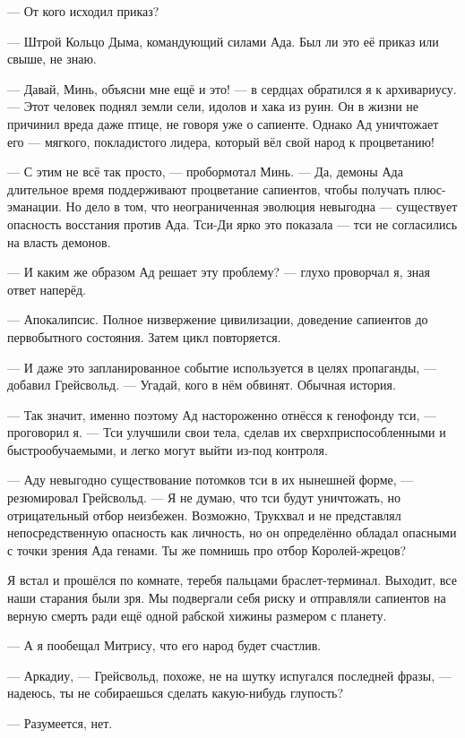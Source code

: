--- От кого исходил приказ?

--- Штрой Кольцо Дыма, командующий силами Ада.
Был ли это её приказ или свыше, не знаю.

--- Давай, Минь, объясни мне ещё и это! --- в сердцах обратился я к архивариусу.
--- Этот человек поднял земли сели, идолов и хака из руин.
Он в жизни не причинил вреда даже птице, не говоря уже о сапиенте.
Однако Ад уничтожает его --- мягкого, покладистого лидера, который вёл свой народ к процветанию!

--- С этим не всё так просто, --- пробормотал Минь.
--- Да, демоны Ада длительное время поддерживают процветание сапиентов, чтобы получать плюс-эманации.
Но дело в том, что неограниченная эволюция невыгодна --- существует опасность восстания против Ада.
Тси-Ди ярко это показала --- тси не согласились на власть демонов.

--- И каким же образом Ад решает эту проблему? --- глухо проворчал я, зная ответ наперёд.

--- Апокалипсис.
Полное низвержение цивилизации, доведение сапиентов до первобытного состояния.
Затем цикл повторяется.

--- И даже это запланированное событие используется в целях пропаганды, --- добавил Грейсвольд.
--- Угадай, кого в нём обвинят.
Обычная история.

--- Так значит, именно поэтому Ад настороженно отнёсся к генофонду тси, --- проговорил я.
--- Тси улучшили свои тела, сделав их сверхприспособленными и быстрообучаемыми, и легко могут выйти из-под контроля.

--- Аду невыгодно существование потомков тси в их нынешней форме, --- резюмировал Грейсвольд.
--- Я не думаю, что тси будут уничтожать, но отрицательный отбор неизбежен.
Возможно, Трукхвал и не представлял непосредственную опасность как личность, но он определённо обладал опасными с точки зрения Ада генами.
Ты же помнишь про отбор Королей-жрецов?

Я встал и прошёлся по комнате, теребя пальцами браслет-терминал.
Выходит, все наши старания были зря.
Мы подвергали себя риску и отправляли сапиентов на верную смерть ради ещё одной рабской хижины размером с планету.

--- А я пообещал Митрису, что его народ будет счастлив.

--- Аркадиу, --- Грейсвольд, похоже, не на шутку испугался последней фразы, --- надеюсь, ты не собираешься сделать какую-нибудь глупость?

--- Разумеется, нет.

